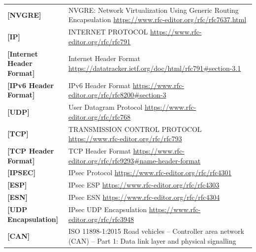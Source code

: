 \begin{longtable}{l p{5in}}
	\label{intro:nvgre}\textbf{[NVGRE]} &
    NVGRE: Network Virtualization Using Generic Routing Encapsulation
	\newline\url{https://www.rfc-editor.org/rfc/rfc7637.html}\\
	\label{intro:IP}\textbf{[IP]} &
    INTERNET PROTOCOL
	\newline\url{https://www.rfc-editor.org/rfc/rfc791}\\
	\label{intro:Internet-Header-Format}\textbf{[Internet Header Format]} &
    Internet Header Format
	\newline\url{https://datatracker.ietf.org/doc/html/rfc791#section-3.1}\\
	\label{intro:IPv6-Header-Format}\textbf{[IPv6 Header Format]} &
    IPv6 Header Format
	\newline\url{https://www.rfc-editor.org/rfc/rfc8200#section-3}\\
	\label{intro:UDP}\textbf{[UDP]} &
    User Datagram Protocol
	\newline\url{https://www.rfc-editor.org/rfc/rfc768}\\
	\label{intro:TCP}\textbf{[TCP]} &
    TRANSMISSION CONTROL PROTOCOL
	\newline\url{https://www.rfc-editor.org/rfc/rfc793}\\
	\label{intro:TCP-Header-Format}\textbf{[TCP Header Format]} &
    TCP Header Format
	\newline\url{https://www.rfc-editor.org/rfc/rfc9293#name-header-format}\\
	\label{intro:IPSEC}\textbf{[IPSEC]} &
    IPsec Protocol
	\newline\url{https://www.rfc-editor.org/rfc/rfc4301}\\
	\label{intro:ESP}\textbf{[ESP]} &
    IPsec ESP
	\newline\url{https://www.rfc-editor.org/rfc/rfc4303}\\
	\label{intro:ESN}\textbf{[ESN]} &
    IPsec ESN
	\newline\url{https://www.rfc-editor.org/rfc/rfc4304}\\
	\label{intro:UDP-Encapsulation}\textbf{[UDP Encapsulation]} &
    IPsec UDP Encapsulation
	\newline\url{https://www.rfc-editor.org/rfc/rfc3948}\\
	\label{intro:CAN}\textbf{[CAN]} &
    ISO 11898-1:2015 Road vehicles -- Controller area network (CAN) -- Part 1: Data link layer and physical signalling\\

\end{longtable}
